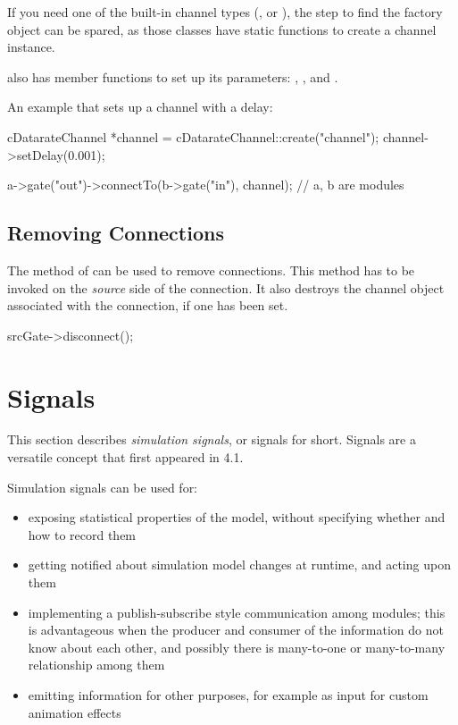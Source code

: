 If you need one of the built-in channel types (,
 or ), the step to find the
factory object can be spared, as those classes have static 
functions to create a channel instance.

 also has member functions to set up its
parameters: , ,
 and .

An example that sets up a channel with a delay:

\begin{cpp}
cDatarateChannel *channel = cDatarateChannel::create("channel");
channel->setDelay(0.001);

a->gate("out")->connectTo(b->gate("in"), channel); // a, b are modules
\end{cpp}


\subsection{Removing Connections}

The  method of  can be
used to remove connections. This method has to be invoked
on the \textit{source} side of the connection. It also destroys
the channel object associated with the connection, if one has been set.

\begin{cpp}
srcGate->disconnect();
\end{cpp}

\section{Signals}
\label{sec:simple-modules:signals}

This section describes \textit{simulation signals}, or signals for short.
Signals are a versatile concept that first appeared in {\opp} 4.1.

Simulation signals can be used for:

\begin{itemize}
  \item exposing statistical properties of the model, without specifying
        whether and how to record them
  \item getting notified about simulation model changes at runtime, and
        acting upon them
  \item implementing a publish-subscribe style communication among modules;
        this is advantageous when the producer and consumer of the information
        do not know about each other, and possibly there is many-to-one or
        many-to-many relationship among them
  \item emitting information for other purposes, for example as input for
        custom animation effects
\end{itemize}

